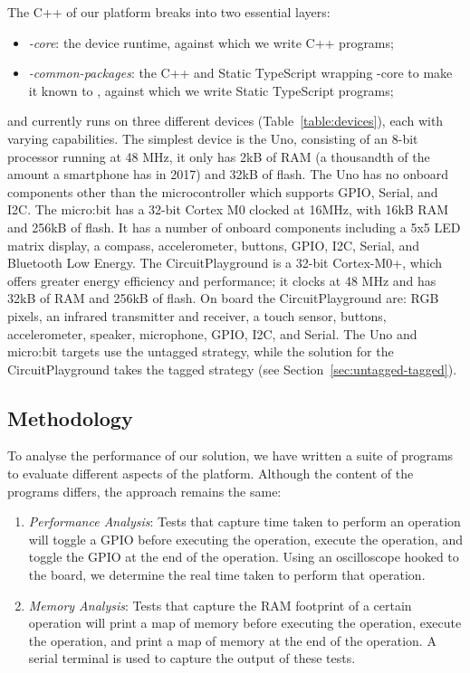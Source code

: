 The C++ of our platform breaks into two essential layers:
\begin{itemize}
\item \emph{\CON-core}: the \CO device runtime, against which we write C++ programs;
\item \emph{\MCN-common-packages}: the C++ and Static TypeScript wrapping \CON-core
to make it known to \MC, against which we write Static TypeScript programs;
\end{itemize}
\MC and \CO currently runs on three different devices (Table~\ref{table:devices}), each with varying capabilities. The simplest device is the Uno, consisting of an 8-bit processor running at 48 MHz, it only has 2kB of RAM (a thousandth of the amount a smartphone has in 2017) and 32kB of flash. The Uno has no onboard components other than the microcontroller which supports GPIO, Serial, and I2C. The micro:bit has a 32-bit Cortex M0 clocked at 16MHz, with 16kB RAM and 256kB of flash. It has a number of onboard components including a 5x5 LED matrix display, a compass, accelerometer, buttons, GPIO, I2C, Serial, and Bluetooth Low Energy. The CircuitPlayground is a 32-bit Cortex-M0+, which offers greater energy efficiency and performance; it clocks at 48 MHz and has 32kB of RAM and 256kB of flash. On board the CircuitPlayground are: RGB pixels, an infrared transmitter and receiver, a touch sensor, buttons, accelerometer, speaker, microphone, GPIO, I2C, and Serial. The Uno and micro:bit \MC targets use the untagged strategy, while the solution for the CircuitPlayground takes the tagged strategy (see Section~\ref{sec:untagged-tagged}).

\subsection{Methodology}

To analyse the performance of our solution, we have written a suite of programs to evaluate different aspects of the platform. Although the content of the programs differs, the approach remains the same:

\begin{enumerate}
    \item \textit{Performance Analysis}: Tests that capture time taken to perform an operation will toggle a GPIO before executing the operation, execute the operation, and toggle the GPIO at the end of the operation. Using an oscilloscope hooked to the board, we determine the real time taken to perform that operation.

    \item \textit{Memory Analysis}: Tests that capture the RAM footprint of a certain operation will print a map of memory before executing the operation, execute the operation, and print a map of memory at the end of the operation. A serial terminal is used to capture the output of these tests.
\end{enumerate}

